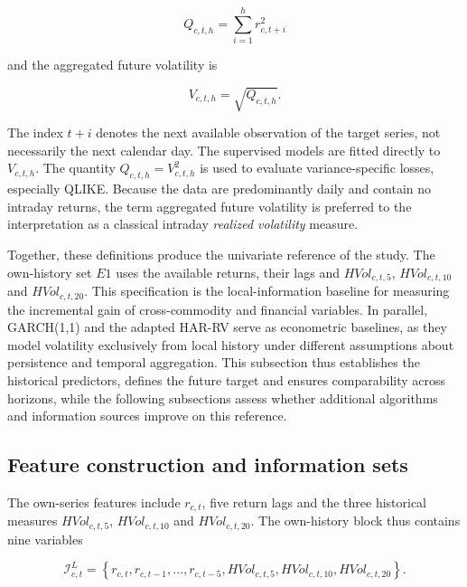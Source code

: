 \documentclass[a4paper,fleqn]{cas-sc}
\begin{document}
\begin{equation}
Q_{c,t,h}=\sum_{i=1}^{h}r_{c,t+i}^{2}
\label{eq:forward_variance}
\end{equation}

and the aggregated future volatility is

\begin{equation}
V_{c,t,h}=\sqrt{Q_{c,t,h}}.
\label{eq:forward_vol}
\end{equation}

The index \(t+i\) denotes the next available observation of the target series, not necessarily the next calendar day. The supervised models are fitted directly to \(V_{c,t,h}\). The quantity \(Q_{c,t,h}=V_{c,t,h}^{2}\) is used to evaluate variance-specific losses, especially QLIKE. Because the data are predominantly daily and contain no intraday returns, the term aggregated future volatility is preferred to the interpretation as a classical intraday \textit{realized volatility} measure.

Together, these definitions produce the univariate reference of the study. The own-history set \(E1\) uses the available returns, their lags and \(HVol_{c,t,5}\), \(HVol_{c,t,10}\) and \(HVol_{c,t,20}\). This specification is the local-information baseline for measuring the incremental gain of cross-commodity and financial variables. In parallel, GARCH(1,1) and the adapted HAR-RV serve as econometric baselines, as they model volatility exclusively from local history under different assumptions about persistence and temporal aggregation. This subsection thus establishes the historical predictors, defines the future target and ensures comparability across horizons, while the following subsections assess whether additional algorithms and information sources improve on this reference.

\subsection{Feature construction and information sets}
\label{subsec:features}

The own-series features include \(r_{c,t}\), five return lags and the three historical measures \(HVol_{c,t,5}\), \(HVol_{c,t,10}\) and \(HVol_{c,t,20}\). The own-history block thus contains nine variables

\begin{equation}
\mathcal{I}^{L}_{c,t}
=
\left\{
r_{c,t},r_{c,t-1},\ldots,r_{c,t-5},
HVol_{c,t,5},HVol_{c,t,10},HVol_{c,t,20}
\right\}.
\label{eq:local_info}
\end{equation}
\end{document}
